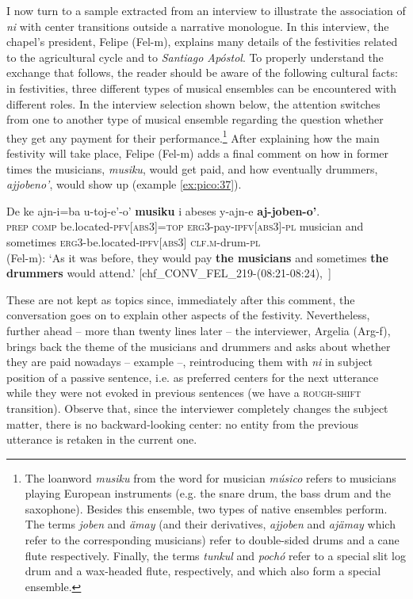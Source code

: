 \documentclass[output=paper
,modfonts
,nonflat]{langsci/langscibook}
\begin{document}
I now turn to a sample extracted from an interview to illustrate the association of \textit{ni} with center transitions outside a narrative monologue. In this interview, the chapel's president, Felipe (Fel-m), explains many details of the festivities related to the agricultural cycle and to \textit {Santiago Apóstol}. To properly understand the exchange that follows, the reader should be aware of the following cultural facts: in  festivities, three different types of musical ensembles can be encountered with different roles. In the interview selection shown below, the attention switches from one to another type of musical ensemble regarding the question whether they get any payment for their performance.\footnote{The loanword \textit{musiku} from the  word for musician \textit{músico} refers to musicians playing European instruments (e.g. the snare drum, the bass drum and the saxophone). Besides this ensemble, two types of native ensembles perform. The terms \textit{joben} and \textit{ämay}  (and their derivatives, \textit{ajjoben} and \textit{ajämay} which refer to the corresponding musicians) refer to double-sided drums and a cane flute respectively. Finally, the terms \textit{tunkul} and \textit{pochó} refer to a special slit log drum and a wax-headed flute, respectively, and which also form a special ensemble.} 
After explaining how the main festivity will take place, Felipe (Fel-m) adds a final comment on how in former times the musicians, \textit{musiku}, would get paid, and how eventually drummers, \textit{ajjobeno'}, would show up (example \ref{ex:pico:37}). 


\ea \label{ex:pico:37}

\gll De ke ajn-i=ba u-toj-e'-o' \textbf{musiku} i abeses y-ajn-e \textbf{aj-joben-o'}.\\
\textsc{prep} \textsc{comp} be.located-\textsc{pfv[abs3]}=\textsc{top} {\textsc{erg3}}-pay-{\textsc{ipfv[abs3]}}-{\textsc{pl}} musician and sometimes \textsc{erg3}-be.located-\textsc{ipfv[abs3]} \textsc{clf.m}-drum-\textsc{pl}\\

\glt (Fel-m): `As it was before, they would pay \textbf{the musicians} and sometimes \textbf{the drummers} would attend.' [chf\_CONV\_FEL\_219-(08:21-08:24),~\citealt{Delgado-Galvan2018archive}] 
\z


These are not kept as topics since, immediately after this comment, the conversation goes on to explain other aspects of the festivity. Nevertheless, further ahead -- more than twenty lines later -- the interviewer, Argelia (Arg-f), brings back the theme of the musicians and drummers and asks about whether they are paid nowadays -- example  --, reintroducing them with \textit{ni} in subject position of a passive sentence, i.e. as preferred centers for the next utterance while they were not evoked in previous sentences (we have a \textsc{rough-shift} transition). Observe that, since the interviewer completely changes the subject matter, there is no backward-looking center: no entity from the previous utterance is retaken in the current one.
\end{document}
